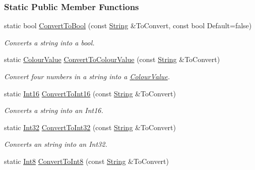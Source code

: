 \subsubsection*{Static Public Member Functions}
\begin{DoxyCompactItemize}
\item 
static bool \hyperlink{classMezzanine_1_1StringTool_a93db670931d3c9e7f90bc5e73513c273}{ConvertToBool} (const \hyperlink{namespaceMezzanine_acf9fcc130e6ebf08e3d8491aebcf1c86}{String} \&ToConvert, const bool Default=false)
\begin{DoxyCompactList}\small\item\em Converts a string into a bool. \item\end{DoxyCompactList}\item 
static \hyperlink{classMezzanine_1_1ColourValue}{ColourValue} \hyperlink{classMezzanine_1_1StringTool_a27b3e5bdd8761633fe2f3ccbb7f0700f}{ConvertToColourValue} (const \hyperlink{namespaceMezzanine_acf9fcc130e6ebf08e3d8491aebcf1c86}{String} \&ToConvert)
\begin{DoxyCompactList}\small\item\em Convert four numbers in a string into a \hyperlink{classMezzanine_1_1ColourValue}{ColourValue}. \item\end{DoxyCompactList}\item 
static \hyperlink{namespaceMezzanine_adb602bffcbc8f1b381b2f529e9e364f6}{Int16} \hyperlink{classMezzanine_1_1StringTool_a790022e0ce2f12cf5b03b625c863d4d4}{ConvertToInt16} (const \hyperlink{namespaceMezzanine_acf9fcc130e6ebf08e3d8491aebcf1c86}{String} \&ToConvert)
\begin{DoxyCompactList}\small\item\em Converts a string into an Int16. \item\end{DoxyCompactList}\item 
static \hyperlink{namespaceMezzanine_a590a2f3eb4a187e1b25209e546e540e1}{Int32} \hyperlink{classMezzanine_1_1StringTool_aa8dce03a78fa30d85b4ce3562f93fcc4}{ConvertToInt32} (const \hyperlink{namespaceMezzanine_acf9fcc130e6ebf08e3d8491aebcf1c86}{String} \&ToConvert)
\begin{DoxyCompactList}\small\item\em Converts an string into an Int32. \item\end{DoxyCompactList}\item 
static \hyperlink{namespaceMezzanine_acbb048ee99aa07566d5a6eb33f5a2c2d}{Int8} \hyperlink{classMezzanine_1_1StringTool_a4977d023653eafcbf3a099a1ac8f41db}{ConvertToInt8} (const \hyperlink{namespaceMezzanine_acf9fcc130e6ebf08e3d8491aebcf1c86}{String} \&ToConvert)

\end{DoxyCompactItemize}
